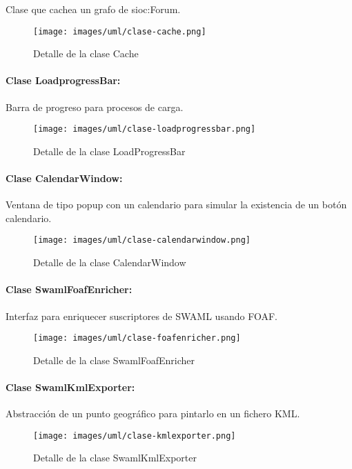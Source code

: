 Clase que cachea un grafo de sioc:Forum.

\begin{figure}[H]
	\centering
 	\texttt{[image: images/uml/clase-cache.png]}
	\caption{Detalle de la clase Cache}
	\label{fig:uml:cache-class}
\end{figure}

\paragraph{Clase LoadprogressBar:}

Barra de progreso para procesos de carga.

\begin{figure}[H]
	\centering
 	\texttt{[image: images/uml/clase-loadprogressbar.png]}
	\caption{Detalle de la clase LoadProgressBar}
	\label{fig:uml:loadprogressbar-class}
\end{figure}

\paragraph{Clase CalendarWindow:}

Ventana de tipo popup con un calendario para simular la existencia de un
botón calendario.

\begin{figure}[H]
	\centering
 	\texttt{[image: images/uml/clase-calendarwindow.png]}
	\caption{Detalle de la clase CalendarWindow}
	\label{fig:uml:calenarwindow-class}
\end{figure}

\paragraph{Clase SwamlFoafEnricher:}

Interfaz para enriquecer suscriptores de SWAML usando FOAF.

\begin{figure}[H]
	\centering
 	\texttt{[image: images/uml/clase-foafenricher.png]}
	\caption{Detalle de la clase SwamlFoafEnricher}
	\label{fig:uml:swamlfoafenricher-class}
\end{figure}

\paragraph{Clase SwamlKmlExporter:}

Abstracción de un punto geográfico para pintarlo en un fichero KML.

\begin{figure}[H]
	\centering
 	\texttt{[image: images/uml/clase-kmlexporter.png]}
	\caption{Detalle de la clase SwamlKmlExporter}
	\label{fig:uml:swamlkmlexporter-class}
\end{figure}
